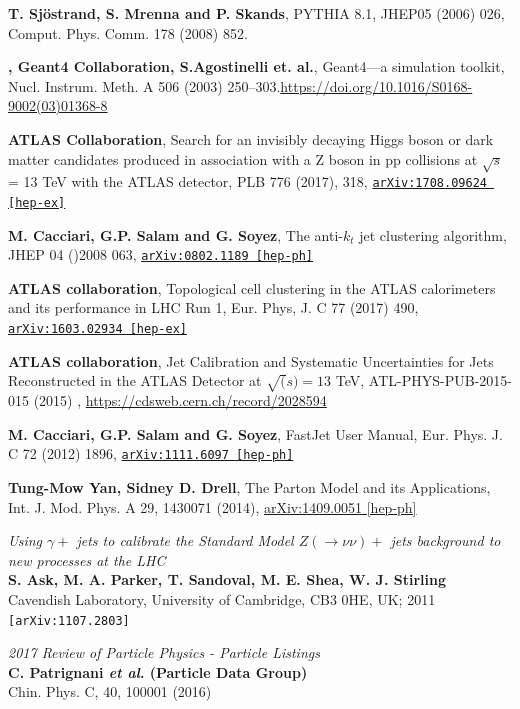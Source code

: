 \documentclass[11pt,a4paper,openright,twoside]{report}
\begin{document}
\begin{thebibliography}{9}
\textbf{T. Sjöstrand, S. Mrenna and P. Skands}, PYTHIA 8.1, JHEP05 (2006) 026, Comput. Phys. Comm. 178 (2008) 852.

\textbf{, Geant4 Collaboration, S.Agostinelli et. al.}, Geant4—a simulation toolkit, Nucl. Instrum. Meth. A 506 (2003) 250–303.\url{https://doi.org/10.1016/S0168-9002(03)01368-8}

	\textbf{ATLAS Collaboration}, Search for an invisibly decaying Higgs boson or dark matter candidates produced in association with a Z boson in pp collisions at $\sqrt{s}$ = 13 TeV with the ATLAS detector, PLB 776 (2017), 318, \href{https://arxiv.org/abs/1708.09624}{\texttt{arXiv:1708.09624 [hep-ex]}}
	
	\textbf{M. Cacciari, G.P. Salam and G. Soyez}, The anti-$k_t$ jet clustering algorithm, JHEP 04 ()2008 063, \href{https://arxiv.org/abs/0802.1189}{\texttt{arXiv:0802.1189 [hep-ph]}}
	
	\textbf{ATLAS collaboration}, Topological cell clustering in the ATLAS calorimeters and its performance in LHC Run 1, Eur. Phys, J. C 77 (2017) 490, \href{https://arxiv.org/abs/1603.02934}{\texttt{arXiv:1603.02934 [hep-ex]}}
	
	\textbf{ATLAS collaboration}, Jet Calibration and Systematic Uncertainties for Jets Reconstructed in the ATLAS Detector at $\sqrt(s)=13$ TeV, ATL-PHYS-PUB-2015-015 (2015) , \url{https://cdsweb.cern.ch/record/2028594}
	
	\textbf{M. Cacciari, G.P. Salam and G. Soyez}, FastJet User Manual, Eur. Phys. J. C 72 (2012) 1896, \href{https://arxiv.org/abs/1111.6097}{\texttt{arXiv:1111.6097 [hep-ph]}}
	
	\textbf{Tung-Mow Yan, Sidney D. Drell}, The Parton Model and its Applications, Int. J. Mod. Phys. A 29, 1430071 (2014),  \href{https://arxiv.org/abs/1409.0051}{arXiv:1409.0051 [hep-ph]}
	
	\textit{Using $\gamma +$ jets to calibrate the Standard Model $Z(\rightarrow \nu\nu)+$ jets background to new processes at the LHC}\\
	\textbf{S. Ask, M. A. Parker, T. Sandoval, M. E. Shea, W. J. Stirling}\\
Cavendish Laboratory, University of Cambridge, CB3 0HE, UK; 2011\\
	\texttt{[arXiv:1107.2803]}

	\textit{2017 Review of Particle Physics - Particle Listings}\\
	\textbf{C. Patrignani \textit{et al}. (Particle Data Group)}\\
	Chin. Phys. C, 40, 100001 (2016)


\end{thebibliography}
\end{document}
